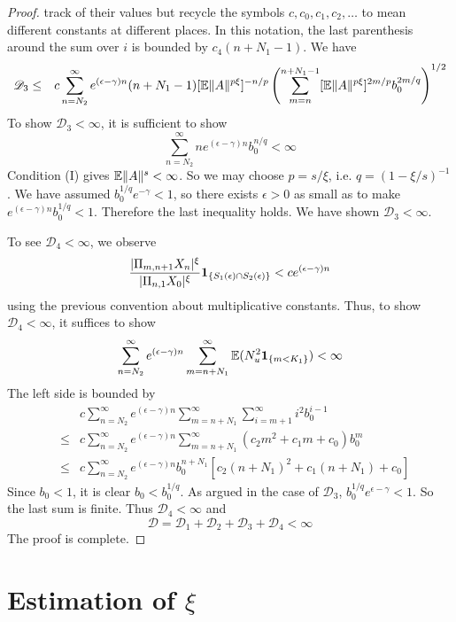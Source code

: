 \documentclass[aoas,preprint]{imsart}
\numberwithin{equation}{section}
\theoremstyle{plain}
\begin{document}
\begin{proof}
track of their values but recycle the symbols $c, c_0, c_1, c_2, \dots$
to mean different constants at different places. In this notation, the
last parenthesis around the sum over $i$ is bounded by
$c_4 (n + N_1 -1)$. We have
\begin{eqnarray*}
  \mathscr D_3
  &\leq&
  c \sum_{n=N_2}^\infty
  e^{(\epsilon - \gamma) n}
  (n + N_1 - 1)
  [\mathbb{E} \|A\|^{p \xi}]^{-n/p}
  \left(
  \sum_{m=n}^{n + N_1 - 1}
      [\mathbb{E}  \|A\|^{p \xi}]^{2m/p}
      b_0^{2m/q}
 \right)^{1/2}
\end{eqnarray*}
To show $\mathscr D_3 < \infty$, it is sufficient to show
\[
\sum_{n=N_2}^\infty
n e^{(\epsilon - \gamma) n}
b_0^{n/q}
< \infty
\]
Condition (I) gives $\mathbb{E} \|A\|^{s} < \infty$. So we may choose
$p = s/\xi$, i.e. $q = (1 - \xi/s)^{-1}$. We have assumed
$b_0^{1/q}  e^{-\gamma} < 1$, so there exists $\epsilon > 0$
as small as to make $e^{(\epsilon - \gamma) n} b_0^{1/q} < 1$.
Therefore the last inequality holds. We have shown
$\mathscr D_3 < \infty$.

To see $\mathscr D_4 < \infty$, we observe
\[
  {
    |\Pi_{m, n+1} X_n |^{\xi}
    \over
    |\Pi_{n, 1} X_0 |^{\xi}        
  } \mathbf{1}_{\{S_1(\epsilon) \cap S_2(\epsilon)\}}
  <
  c e^{(\epsilon - \gamma) n} 
\]
using the previous convention about multiplicative constants. Thus, to
show $\mathscr D_4 < \infty$, it suffices to show
\[
\sum_{n=N_2}^\infty
e^{(\epsilon - \gamma) n} 
\sum_{m=n+N_1}^\infty
\mathbb{E} (N_u^2 \mathbf{1}_{\{m < K_1\}}) < \infty
\]
The left side is bounded by
\begin{eqnarray*}
  &&
  c \sum_{n=N_2}^\infty
  e^{(\epsilon - \gamma) n} 
  \sum_{m=n+N_1}^\infty
  \sum_{i=m+1}^\infty
  i^2 b_0^{i-1} \\
  &\leq&
  c \sum_{n=N_2}^\infty
  e^{(\epsilon - \gamma) n}   
  \sum_{m=n+N_1}^\infty
  (c_2 m^2 + c_1 m + c_0) b_0^m \\
  &\leq&
  c \sum_{n=N_2}^\infty
  e^{(\epsilon - \gamma) n} b_0^{n + N_1}
  [c_2 (n + N_1)^2 + c_1 (n + N_1) + c_0]
\end{eqnarray*}
Since $b_0 < 1$, it is clear $b_0 < b_0^{1/q}$.
As argued in the case of $\mathscr D_3$,
$b_0^{1/q} e^{\epsilon - \gamma} < 1$. So the last sum is finite.
Thus $\mathscr D_4 < \infty$ and
\[
\mathscr D
=
\mathscr D_1 + \mathscr D_2 + \mathscr D_3 + \mathscr D_4
< \infty
\]
The proof is complete.
\end{proof}

\section[Estimation of xi]{Estimation of $\xi$}
\end{document}
